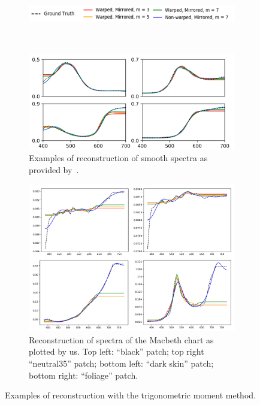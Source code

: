 \begin{figure}[t]
	\centering
	\begin{subfigure}[t]{0.70\textwidth}
	\includegraphics[width=\linewidth]{img/moments_reconstruction_legend.png}
	\end{subfigure} \\
	\vspace{1em}
	\begin{subfigure}[t]{0.45\textwidth}
		\includegraphics[width=\linewidth,height=0.2\textheight]{img/moments_reconstruction_Peters.png}
		\caption{Examples of reconstruction of smooth spectra as provided by~\citet{trigonometricMomentsPaper}.}
		\label{fig:momentsReconstructionPeters}
	\end{subfigure} \hspace{0.1em}
	\begin{subfigure}[t]{0.45\textwidth}
		\includegraphics[width=\linewidth]{img/moments_reconstruction_ours.png}
		\caption{Reconstruction of spectra of the Macbeth chart as plotted by us. Top left: ``black'' patch; top right ``neutral35'' patch; bottom left: ``dark skin'' patch; bottom right: ``foliage'' patch.}
		\label{fig:momentsReconstructionOur}
	\end{subfigure}
	\caption{Examples of reconstruction with the trigonometric moment method.}
	\label{fig:momentsReconstructionComparison}
\end{figure}

